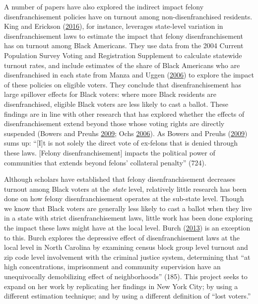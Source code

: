 \documentclass[12pt,]{article}
\begin{document}
A number of papers have also explored the indirect impact felony disenfranchisement policies have on turnout among non-disenfranchised residents. King and Erickson (\protect\hyperlink{ref-King2016}{2016}), for instance, leverages state-level variation in disenfranchisement laws to estimate the impact that felony disenfranchisement has on turnout among Black Americans. They use data from the 2004 Current Population Survey Voting and Registration Supplement to calculate statewide turnout rates, and include estimates of the share of Black Americans who are disenfranchised in each state from Manza and Uggen (\protect\hyperlink{ref-locked_out}{2006}) to explore the impact of these policies on eligible voters. They conclude that disenfranchisement has large spillover effects for Black voters: where more Black residents are disenfranchised, eligible Black voters are less likely to cast a ballot. These findings are in line with other research that has explored whether the effects of disenfranchisement extend beyond those whose voting rights are directly suspended (Bowers and Preuhs \protect\hyperlink{ref-Bowers2009}{2009}; Ochs \protect\hyperlink{ref-Ochs2006}{2006}). As Bowers and Preuhs (\protect\hyperlink{ref-Bowers2009}{2009}) sums up: ``{[}I{]}t is not solely the direct vote of ex-felons that is denied through these laws. {[}Felony disenfranchisement{]} impacts the political power of communities that extends beyond felons' collateral penalty'' (724).

Although scholars have established that felony disenfranchisement decreases turnout among Black voters at the \emph{state} level, relatively little research has been done on how felony disenfranchisement operates at the sub-state level. Though we know that Black voters are generally less likely to cast a ballot when they live in a state with strict disenfranchisement laws, little work has been done exploring the impact these laws might have at the local level. Burch (\protect\hyperlink{ref-Burch2013}{2013}) is an exception to this. Burch explores the depressive effect of disenfranchisement laws at the local level in North Carolina by examining census block group level turnout and zip code level involvement with the criminal justice system, determining that ``at high concentrations, imprisonment and community supervision have an unequivocally demobilizing effect of neighborhoods'' (185). This project seeks to expand on her work by replicating her findings in New York City; by using a different estimation technique; and by using a different definition of ``lost voters.''
\end{document}
